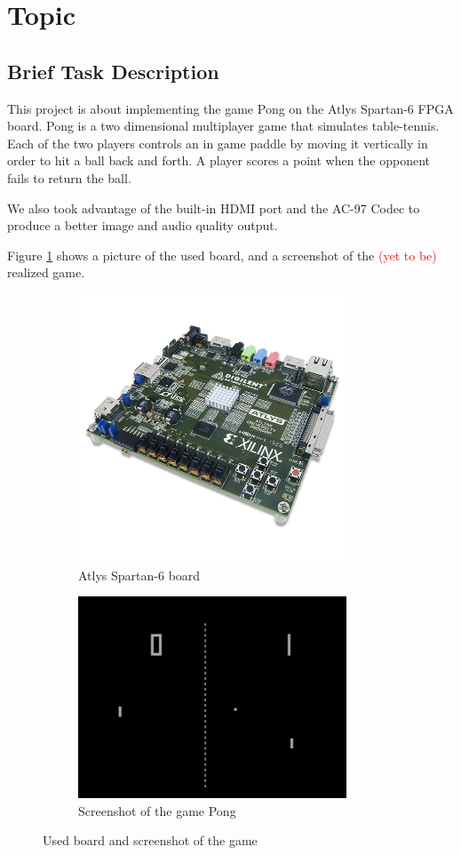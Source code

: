 \section{Topic}
	\subsection{Brief Task Description}
	This project is about implementing the game Pong on the Atlys Spartan-6 FPGA board. Pong is a two dimensional multiplayer game that simulates table-tennis. Each of the two players controls an in game paddle by moving it vertically in order to hit a ball back and forth. A player scores a point when the opponent fails to return the ball. 
	
	We also took advantage of the built-in HDMI port and the AC-97 Codec to produce a better image and audio quality output. 
	
	Figure \ref{board+screenshot} shows a picture of the used board, and a screenshot of the \textcolor{red}{(yet to be)} realized game. 
	
	\begin{figure}[h]
		\begin{subfigure}[b]{.4\textwidth}
			\includegraphics[width=8cm]{images/atlys_pic.png}
			\caption{Atlys Spartan-6 board}
		\end{subfigure}
		\hfill
		\begin{subfigure}[b]{.4\textwidth}
			\includegraphics[width=8cm]{images/pong_screenshot.png}		
			\caption{Screenshot of the game Pong}
		\end{subfigure}
		
	\caption{Used board and screenshot of the game}
	\label{board+screenshot}
	\end{figure}
	

